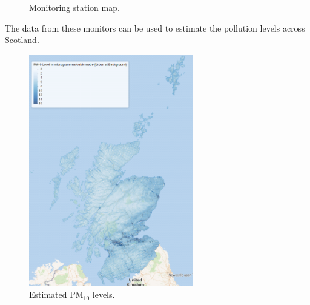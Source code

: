 \documentclass[
  letterpaper,
  DIV=11,
  numbers=noendperiod]{scrartcl}
\begin{document}
\begin{tcolorbox}
\begin{figure}[H]
{}

\caption{Monitoring station map.}

\end{figure}%

The data from these monitors can be used to estimate the pollution
levels across Scotland.

\begin{figure}[H]

{\centering \includegraphics[width=2.8125in,height=\textheight]{images/Result-PM10.png}

}

\caption{Estimated PM\(_{10}\) levels.}

\end{figure}%

\end{tcolorbox}
\end{document}
